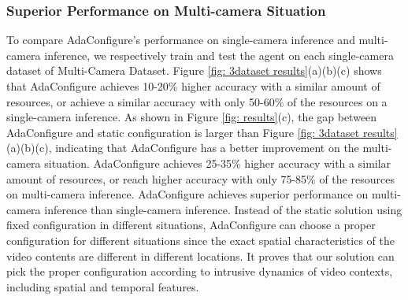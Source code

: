 \subsubsection{Superior Performance on Multi-camera Situation}
\label{subsec: superior performance}

To compare AdaConfigure's performance on single-camera inference and multi-camera inference, we respectively train and test the agent on each single-camera dataset of Multi-Camera Dataset. Figure \ref{fig: 3dataset results}(a)(b)(c) shows that AdaConfigure achieves 10-20\% higher accuracy with a similar amount of resources, or achieve a similar accuracy with only 50-60\% of the resources on a single-camera inference.  As shown in Figure \ref{fig: results}(c), the gap between AdaConfigure and static configuration is larger than Figure \ref{fig: 3dataset results}(a)(b)(c), indicating that AdaConfigure has a better improvement on the multi-camera situation. AdaConfigure achieves 25-35\% higher accuracy with a similar amount of resources, or reach higher accuracy with only 75-85\% of the resources on multi-camera inference. AdaConfigure achieves superior performance on multi-camera inference than single-camera inference. Instead of the static solution using fixed configuration in different situations, AdaConfigure can choose a proper configuration for different situations since the exact spatial characteristics of the video contents are different in different locations. It proves that our solution can pick the proper configuration according to intrusive dynamics of video contexts, including spatial and temporal features.

